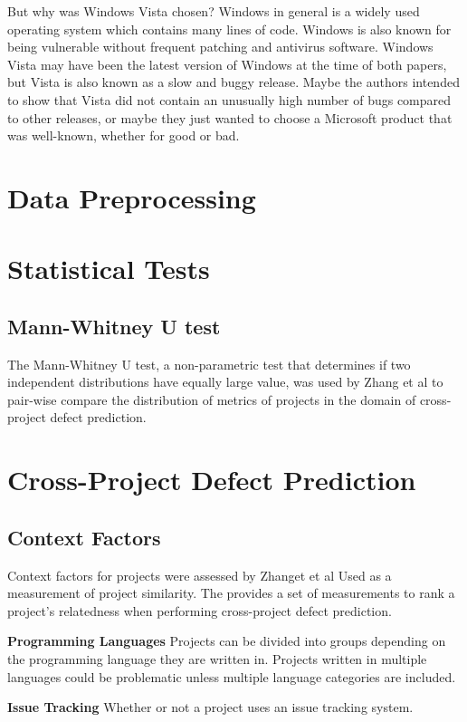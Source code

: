 \documentclass{sig-alternate-05-2015}
\begin{document}
But why was Windows Vista chosen? Windows in general is a widely used operating system which contains many lines of code. Windows is also known for being vulnerable without frequent patching and antivirus software. Windows Vista may have been the latest version of Windows at the time of both papers, but Vista is also known as a slow and buggy release. Maybe the authors intended to show that Vista did not contain an unusually high number of bugs compared to other releases, or maybe they just wanted to choose a Microsoft product that was well-known, whether for good or bad.


\section{Data Preprocessing}

\section{Statistical Tests}
\subsection{Mann-Whitney U test}
The Mann-Whitney U test, a non-parametric test that determines if two independent distributions have equally large value,  was used by Zhang et al \cite{Zhang:2014:TBU:2597073.2597078} to pair-wise compare the distribution of metrics of projects in the domain of cross-project defect prediction.


\section{Cross-Project Defect Prediction}

\subsection{Context Factors}
Context factors for projects were assessed by Zhanget et al \cite{Zhang:2014:TBU:2597073.2597078}  Used as a measurement of project similarity. The provides a set of measurements to rank a project's relatedness when performing cross-project defect prediction.

\textbf{Programming Languages} Projects can be divided into groups depending on the programming language they are written in. Projects written in multiple languages could be problematic unless multiple language categories are included.

\textbf{Issue Tracking} Whether or not a project uses an issue tracking system.
\end{document}
